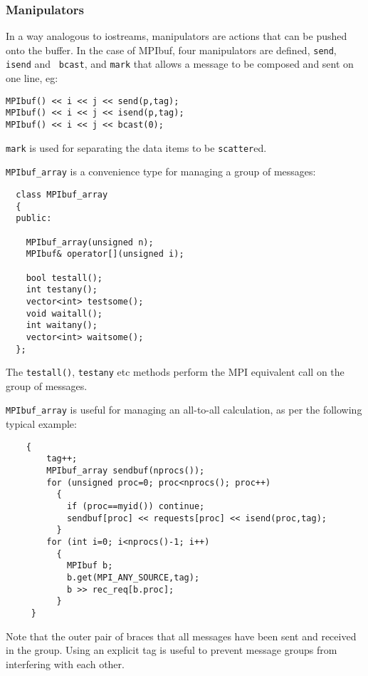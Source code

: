 \subsubsection{Manipulators}

In a way analogous to iostreams, manipulators are actions that can be
pushed onto the buffer. In the case of MPIbuf, four manipulators are
defined, {\tt send}, {\tt isend} and {\tt
  bcast}, and {\tt mark} that allows a
message to be composed and sent on one line, eg:
\begin{verbatim}
MPIbuf() << i << j << send(p,tag);
MPIbuf() << i << j << isend(p,tag);
MPIbuf() << i << j << bcast(0);
\end{verbatim}

{\tt mark} is used for separating the data items to be {\tt scatter}ed.


\verb+MPIbuf_array+ is a convenience type for managing a group of
messages:
\begin{verbatim}
  class MPIbuf_array
  {
  public:
    
    MPIbuf_array(unsigned n);
    MPIbuf& operator[](unsigned i);

    bool testall();
    int testany();
    vector<int> testsome();
    void waitall();
    int waitany();
    vector<int> waitsome();
  };
\end{verbatim}

The \verb+testall()+, \verb+testany+ etc methods perform the MPI
equivalent call on the group of messages.

\verb+MPIbuf_array+ is useful for managing an all-to-all calculation,
as per the following typical example:

\begin{verbatim}
    {
        tag++;
        MPIbuf_array sendbuf(nprocs());
        for (unsigned proc=0; proc<nprocs(); proc++)
          {
            if (proc==myid()) continue;
            sendbuf[proc] << requests[proc] << isend(proc,tag);
          }
        for (int i=0; i<nprocs()-1; i++)
          {
            MPIbuf b; 
            b.get(MPI_ANY_SOURCE,tag);
            b >> rec_req[b.proc];
          }
     }
\end{verbatim}

Note that the outer pair of braces that all messages have been sent
and received in the group. Using an explicit tag is useful to prevent
message groups from interfering with each other.

